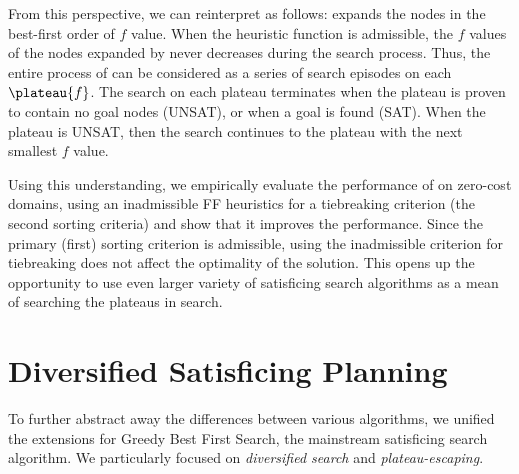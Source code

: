 
From this perspective, we can reinterpret \astar as follows: \astar expands the
nodes in the best-first order of $f$ value. When the heuristic function is admissible, the $f$ values of
the nodes expanded by \astar never decreases during the search process.  Thus, the entire process of
\astar can be considered as a series of search episodes on each $\plateau{f}$.  The search on each
plateau terminates when the plateau is proven to contain no goal nodes (UNSAT), or when a goal is
found (SAT).  When the plateau is UNSAT, then the search continues to the plateau with the next
smallest $f$ value.


Using this understanding, we empirically evaluate the performance of \astar on zero-cost domains,
using an inadmissible FF heuristics \cite{Hoffmann01} for a tiebreaking criterion (the second
sorting criteria) and show that it improves the performance. Since the primary (first) sorting
criterion is admissible, using the inadmissible criterion for tiebreaking does not affect the
optimality of the solution. This opens up the opportunity to use even larger variety of satisficing
search algorithms as a mean of searching the plateaus in \astar search.

\section{Diversified Satisficing Planning}

\label{sec:sat}

To further abstract away the differences between various algorithms, we unified the extensions for
Greedy Best First Search, the mainstream satisficing search algorithm. We particularly focused on
\emph{diversified search} and \emph{plateau-escaping}.

